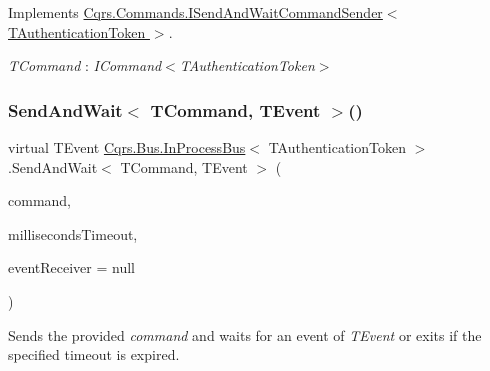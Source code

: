 Implements \hyperlink{interfaceCqrs_1_1Commands_1_1ISendAndWaitCommandSender_ab64dd5144f0688b0e23ffe289d4ffa2e_ab64dd5144f0688b0e23ffe289d4ffa2e}{Cqrs.\+Commands.\+I\+Send\+And\+Wait\+Command\+Sender$<$ T\+Authentication\+Token $>$}.

\begin{Desc}
\item[Type Constraints]\begin{description}
\item[{\em T\+Command} : {\em I\+Command$<$T\+Authentication\+Token$>$}]\end{description}
\end{Desc}
\mbox{\label{classCqrs_1_1Bus_1_1InProcessBus_a1b3540fe06b60cd601eaff4ea53f5465_a1b3540fe06b60cd601eaff4ea53f5465}} 
\subsubsection{\texorpdfstring{Send\+And\+Wait$<$ T\+Command, T\+Event $>$()}{SendAndWait< TCommand, TEvent >()}\hspace{0.1cm}{\footnotesize\ttfamily [2/6]}}
{\footnotesize\ttfamily virtual T\+Event \hyperlink{classCqrs_1_1Bus_1_1InProcessBus}{Cqrs.\+Bus.\+In\+Process\+Bus}$<$ T\+Authentication\+Token $>$.Send\+And\+Wait$<$ T\+Command, T\+Event $>$ (\begin{DoxyParamCaption}\item[{T\+Command}]{command,  }\item[{int}]{milliseconds\+Timeout,  }\item[{\hyperlink{interfaceCqrs_1_1Events_1_1IEventReceiver}{I\+Event\+Receiver}$<$ T\+Authentication\+Token $>$}]{event\+Receiver = {\ttfamily null} }\end{DoxyParamCaption})\hspace{0.3cm}{\ttfamily [virtual]}}



Sends the provided {\itshape command}  and waits for an event of {\itshape T\+Event}  or exits if the specified timeout is expired. 



